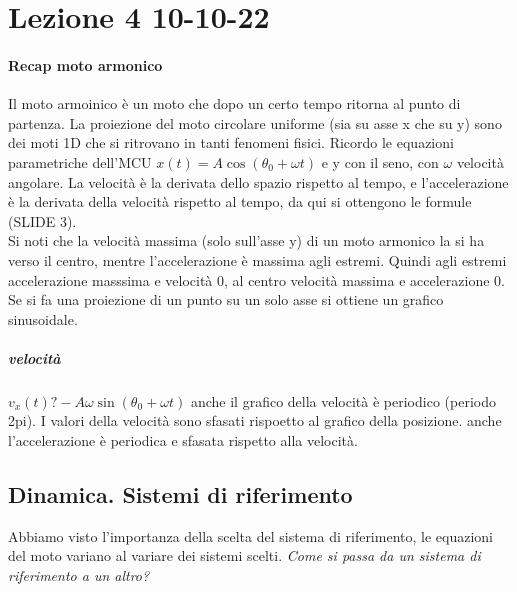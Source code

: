 \documentclass[12pt, a4paper, openany]{book}
\begin{document}
\section*{Lezione 4 10-10-22}
\paragraph*{Recap moto armonico} %
Il moto armoinico è un moto che dopo un certo tempo ritorna al punto di partenza. 
La proiezione del moto circolare uniforme (sia su asse x che su y) sono dei moti 1D che si ritrovano in tanti fenomeni fisici.
Ricordo le equazioni parametriche dell'MCU $x(t) = A \cos(\theta_0 + \omega t)$ e y con il seno, con $\omega$ velocità angolare.
La velocità è la derivata dello spazio rispetto al tempo, e l'accelerazione è la derivata della velocità rispetto al tempo, da qui si ottengono le formule (SLIDE 3).
\\Si noti che la velocità massima (solo sull'asse y) di un moto armonico la si ha verso il centro, mentre l'accelerazione è massima agli estremi.
Quindi agli estremi accelerazione masssima e velocità 0, al centro velocità massima e accelerazione 0.
Se si fa una proiezione di un punto su un solo asse si ottiene un grafico sinusoidale.
\subparagraph{velocità}$v_x(t)?-A \omega \sin (\theta_0+\omega t)$ anche il grafico della velocità è periodico (periodo 2pi).
I valori della velocità sono sfasati rispoetto al grafico della posizione.
anche l'accelerazione è periodica e sfasata rispetto alla velocità. 
\subsection*{Dinamica. Sistemi di riferimento}%
Abbiamo visto l'importanza della scelta del sistema di riferimento, le equazioni del moto variano al variare dei sistemi scelti.
\emph{Come si passa da un sistema di riferimento a un altro?} 
\end{document}
